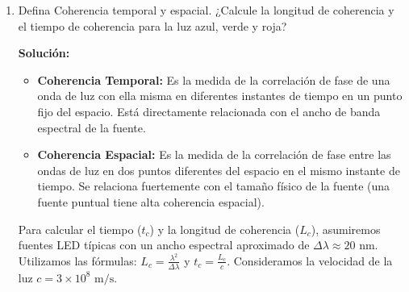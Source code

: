 \documentclass[12pt, letterpaper]{article}
\begin{document}
\begin{enumerate}
\begin{lstlisting}[language=Python]
			if I1 is None or I2 is None:
			raise ValueError("Error al cargar las imagenes.")
			
			# Correlacion por substraccion (rectificada)
			I_resta = np.abs(I2 - I1)
			
			# Correlacion por suma
			I_suma = I1 + I2
			
			# Normalizacion 0-255 en uint8 para visualizacion del contraste
			I_resta_norm = cv2.normalize(I_resta, None, 0, 255, cv2.NORM_MINMAX).astype(np.uint8)
			I_suma_norm = cv2.normalize(I_suma, None, 0, 255, cv2.NORM_MINMAX).astype(np.uint8)
			
			# Visualizacion usando Matplotlib
			fig, axes = plt.subplots(1, 2, figsize=(10, 5))
			axes[0].imshow(I_resta_norm, cmap='gray')
			axes[0].set_title('Franjas por Substraccion')
			axes[0].axis('off')
			
			axes[1].imshow(I_suma_norm, cmap='gray')
			axes[1].set_title('Franjas por Suma')
			axes[1].axis('off')
			
			plt.show()
			
			return I_resta_norm, I_suma_norm
			
			# Uso: correlation_fringes('estado_base.png', 'estado_deformado.png')
		\end{lstlisting}
		
		\item Defina Coherencia temporal y espacial. ¿Calcule la longitud de coherencia y el tiempo de coherencia para la luz azul, verde y roja?
		
		\textbf{Solución:}
		\begin{itemize}
			\item \textbf{Coherencia Temporal:} Es la medida de la correlación de fase de una onda de luz con ella misma en diferentes instantes de tiempo en un punto fijo del espacio. Está directamente relacionada con el ancho de banda espectral de la fuente.
			\item \textbf{Coherencia Espacial:} Es la medida de la correlación de fase entre las ondas de luz en dos puntos diferentes del espacio en el mismo instante de tiempo. Se relaciona fuertemente con el tamaño físico de la fuente (una fuente puntual tiene alta coherencia espacial).
		\end{itemize}
		
		Para calcular el tiempo ($t_c$) y la longitud de coherencia ($L_c$), asumiremos fuentes LED típicas con un ancho espectral aproximado de $\Delta\lambda \approx 20\text{ nm}$. Utilizamos las fórmulas:
		$L_c = \frac{\lambda^2}{\Delta\lambda}$ y $t_c = \frac{L_c}{c}$. Consideramos la velocidad de la luz $c = 3 \times 10^8\text{ m/s}$.
		

\end{enumerate}
\end{document}
